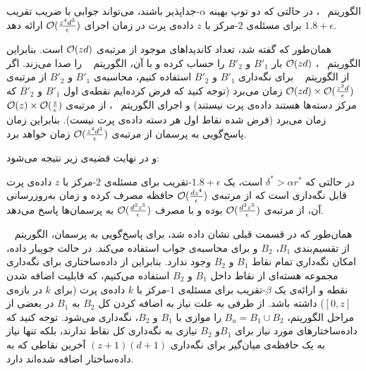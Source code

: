  
 الگوریتم ~، در حالتی که دو توپ بهینه $\alpha$-جداپذیر باشند، می‌تواند جوابی با ضریب تقریب $1.8 + \epsilon$ برای مسئله‌ی $2$-مرکز با $z$ داده‌ی پرت در زمان اجرای $\mathcal{O}(\frac{z^4d^3}{\epsilon})$ ارائه دهد.
 
 
 همان‌طور که گفته شد، تعداد کاندیداهای موجود از مرتبه‌ی $\mathcal{O}(zd)$ است.
 بنابراین الگوریتم ~، $\mathcal{O}(zd)$ بار $B'_1$ و $B'_2$ را حساب کرده و با آن، الگوریتم ~ را صدا می‌زند.
 اگر از الگوریتم ~ برای نگه‌داری $B'_1$ و $B'_2$ استفاده کنیم، محاسبه‌ی $B'_1$ و $B'_2$ از مرتبه‌ی $ \mathcal{O}(zd) \times \mathcal{O}(\frac{z^2d}{\epsilon})$ زمان می‌برد (توجه کنید که فرض کرده‌ایم نقطه‌ی اول $B'_1$ و $B'_2$ که مرکز دسته‌ها هستند داده‌ی پرت نیستند) و اجرای الگوریتم ~، از مرتبه‌ی $\mathcal{O}(z) \times \mathcal{O}(\frac{z}{\epsilon})$ زمان می‌برد (فرض شده نقاط اول هر دسته داده‌ی پرت نیست). بنابراین زمان پاسخ‌گویی به پرسمان از مرتبه‌ی $\mathcal{O}(\frac{z^4d^3}{\epsilon})$ زمان خواهد برد.
 

و در نهایت قضیه‌ی زیر نتیجه می‌شود:

در حالتی که $\delta^* > \alpha r^*$ است، یک $1.8 + \epsilon$-تقریب برای مسئله‌ی $2$-مرکز با $z$ داده‌ی پرت قابل نگه‌داری است که از مرتبه‌ی $\mathcal{O}(\frac{dz^4}{\epsilon})$ حافظه مصرف کرده و زمان به‌روزرسانی آن، از مرتبه‌ی $\mathcal{O}(\frac{d^2z^5}{\epsilon})$ بوده و با مصرف $\mathcal{O}(\frac{d^3z^5}{\epsilon})$ به پرسمان‌ها پاسخ می‌دهد.

همان‌طور که در قسمت قبلی نشان داده شد، برای پاسخ‌گویی به پرسمان، الگوریتم ~ از تقسیم‌بندی $B_1$، $B_2$ و  برای محاسبه‌ی جواب استفاده می‌کند.
در حالت جویبار داده، امکان نگه‌داری تمام نقاط $B_1$ و $B_2$ وجود ندارد.
بنابراین از داده‌ساختاری برای نگه‌داری مجموعه هسته‌ای از نقاط داخل $B_1$ و $B_2$ استفاده می‌کنیم، که قابلیت اضافه شدن نقطه و ارائه‌ی یک $\beta$-تقریب برای مسئله‌ی $1$-مرکز با $k$ داده‌ی پرت (برای $k$ در بازه‌ی $[0, z]$) داشته باشد.
از طرفی به علت نیاز به اضافه کردن کل $B_2$ به $B_1$ در بعضی از مراحل الگوریتم، $B_u = B_1 \cup B_2$ را موازی با $B_1$ و $B_2$، نگه‌داری می‌شود.
توجه کنید که داده‌ساختارهای مورد نیاز برای $B_1$و $B_2$ نیازی به نگه‌داری کل نقاط ندارند، بلکه تنها نیاز به یک حافظه‌ی میان‌گیر برای نگه‌داری $(z+1)(d+1)$ آخرین نقاطی که به داده‌ساختار اضافه شده‌اند دارد.

